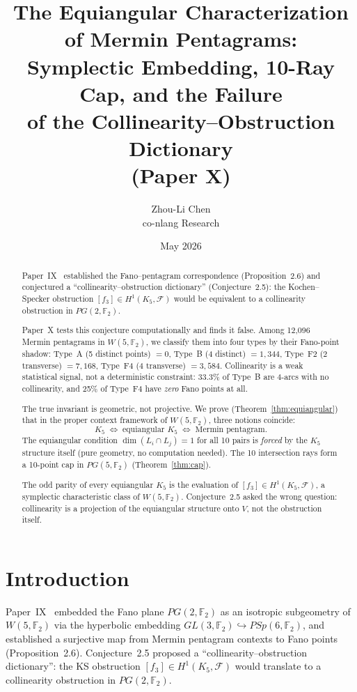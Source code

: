 \documentclass[11pt,a4paper]{article}
\title{The Equiangular Characterization of Mermin Pentagrams:\\
       Symplectic Embedding, 10-Ray Cap, and the Failure\\
       of the Collinearity--Obstruction Dictionary\\
       {\large (Paper X)}}
\author{Zhou-Li Chen \\ co-nlang Research}
\date{May 2026}
\theoremstyle{remark}
\newcommand{\F}{\mathbb{F}}
\newcommand{\cF}{\mathcal{F}}
\begin{document}
\maketitle

\begin{abstract}
  Paper~IX~\cite{PaperIX} established the Fano--pentagram correspondence
  (Proposition~2.6) and conjectured a ``collinearity--obstruction
  dictionary'' (Conjecture~2.5): the Kochen--Specker obstruction
  $[f_3] \in H^1(K_5, \cF)$ would be equivalent to a collinearity
  obstruction in $PG(2, \F_2)$.

  Paper~X tests this conjecture computationally and finds it false.
  Among 12{,}096 Mermin pentagrams in $W(5, \F_2)$, we classify them
  into four types by their Fano-point shadow:
  Type~A (5 distinct points) $= 0$,
  Type~B (4 distinct) $= 1{,}344$,
  Type~F2 (2 transverse) $= 7{,}168$,
  Type~F4 (4 transverse) $= 3{,}584$.
  Collinearity is a weak statistical signal, not a deterministic
  constraint: 33.3\% of Type~B are 4-arcs with no collinearity, and
  25\% of Type~F4 have \emph{zero} Fano points at all.

  The true invariant is geometric, not projective. We prove
  (Theorem~\ref{thm:equiangular}) that in the proper context framework
  of $W(5, \F_2)$, three notions coincide:
  \[
  K_5 \;\Longleftrightarrow\; \text{equiangular } K_5
  \;\Longleftrightarrow\; \text{Mermin pentagram}.
  \]
  The equiangular condition $\dim(L_i \cap L_j) = 1$ for all 10 pairs
  is \emph{forced} by the $K_5$ structure itself (pure geometry, no
  computation needed). The 10 intersection rays form a 10-point cap in
  $PG(5, \F_2)$ (Theorem~\ref{thm:cap}).

  The odd parity of every equiangular $K_5$ is the evaluation of
  $[f_3] \in H^1(K_5, \cF)$, a symplectic characteristic class of
  $W(5, \F_2)$. Conjecture~2.5 asked the wrong question: collinearity
  is a projection of the equiangular structure onto $V$, not the
  obstruction itself.
\end{abstract}

\section{Introduction}
\label{sec:intro}

Paper~IX~\cite{PaperIX} embedded the Fano plane $PG(2, \F_2)$ as an
isotropic subgeometry of $W(5, \F_2)$ via the hyperbolic embedding
$GL(3, \F_2) \hookrightarrow PSp(6, \F_2)$, and established a
surjective map from Mermin pentagram contexts to Fano points
(Proposition~2.6). Conjecture~2.5 proposed a ``collinearity--obstruction
dictionary'': the KS obstruction $[f_3] \in H^1(K_5, \cF)$ would
translate to a collinearity obstruction in $PG(2, \F_2)$.
\end{document}
